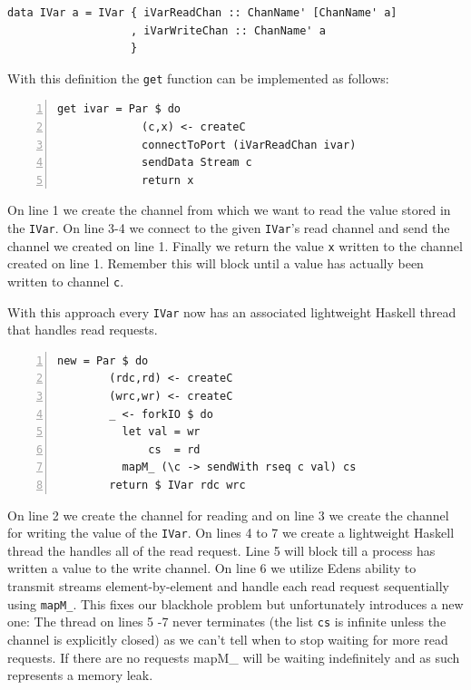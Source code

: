 \documentclass[a4paper, oneside, final]{article}
\begin{document}
\begin{lstlisting}
data IVar a = IVar { iVarReadChan :: ChanName' [ChanName' a]
                   , iVarWriteChan :: ChanName' a
                   }
\end{lstlisting}

With this definition the \texttt{get} function can be implemented as 
follows: \newline

\begin{lstlisting}[numbers=left, numberstyle=\tiny]
get ivar = Par $ do
             (c,x) <- createC
             connectToPort (iVarReadChan ivar)
             sendData Stream c
             return x
\end{lstlisting}

On line 1 we create the channel from which we want to read the value
stored in the \texttt{IVar}. On line 3-4 we connect to the given
\texttt{IVar}'s read channel and send the channel we created on line 1. 
Finally we return the value \texttt{x} written to the channel created on line 1. Remember this will block until a value has actually been written to 
channel \texttt{c}.

With this approach every \texttt{IVar} now has an associated lightweight
Haskell thread that handles read requests. \newline

\begin{lstlisting}[numbers=left, numberstyle=\tiny]
new = Par $ do
        (rdc,rd) <- createC
        (wrc,wr) <- createC
        _ <- forkIO $ do
          let val = wr
              cs  = rd
          mapM_ (\c -> sendWith rseq c val) cs
        return $ IVar rdc wrc
\end{lstlisting}

On line 2 we create the channel for reading and on line 3 we create
the channel for writing the value of the \texttt{IVar}. On lines 4 to
7 we create a lightweight Haskell thread the handles all of the read
request. Line 5 will block till a process has written a value to the
write channel. On line 6 we utilize Edens ability to transmit streams
element-by-element and handle each read request sequentially using
\texttt{mapM\_}. This fixes our blackhole problem but unfortunately
introduces a new one: The thread on lines 5 -7 never terminates (the
list \texttt{cs} is infinite unless the channel is explicitly closed)
as we can't tell when to stop waiting for more read requests. If there
are no requests mapM\_ will be waiting indefinitely and as such
represents a memory leak.
\end{document}
